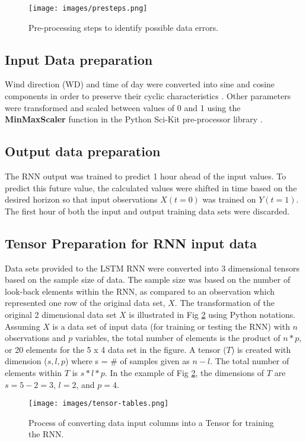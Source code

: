 \documentclass[preprint,12pt,authoryear]{elsarticle}
\begin{document}
\begin{linenumbers}
%
\begin{figure}[H]
\centering
\texttt{[image: images/presteps.png]} 
\caption{Pre-processing steps to identify possible data errors.}
\label{fig:presteps}
\end{figure}
%

\subsection{Input Data preparation}
Wind direction (WD) and time of day were converted into sine and cosine components in order to preserve their cyclic characteristics \citep{Freeman2018a, Arhami2013}. Other parameters were transformed and scaled between values of 0 and 1 \citep{Chatterjee2017} using the \textbf{MinMaxScaler} function in the Python Sci-Kit pre-processor library \citep{scikit2011}. 

\subsection{Output data preparation}
The RNN output was trained to predict 1 hour ahead of the input values. To predict this future value, the calculated values were shifted in time based on the desired horizon so that input observations $X(t=0)$ was trained on $Y(t=1)$.  The first hour of both the input and output training data sets were discarded. 

\subsection{Tensor Preparation for RNN input data}
Data sets provided to the LSTM RNN were converted into 3 dimensional tensors based on the sample size of data. The sample size was based on the number of look-back elements within the RNN, as compared to an observation which represented one row of the original data set, $X$.  The transformation of the original 2 dimensional data set $X$ is illustrated in Fig \ref{fig:tensor-tables} using Python notations. Assuming $X$ is a data set of input data (for training or testing the RNN) with $n$ observations and $p$ variables, the total number of elements is the product of $n * p$, or 20 elements for the 5 x 4 data set in the figure. A tensor ($T$) is created with dimension ($s, l, p$) where s = \# of samples given as $n - l$. The total number of elements within $T$ is $s*l*p$. In the example of Fig \ref{fig:tensor-tables}, the dimensions of $T$ are $s = 5 - 2 = 3$, $l = 2$, and $p = 4$.    
%
\begin{figure}[H]
\centering
\texttt{[image: images/tensor-tables.png]}  %
\caption{Process of converting data input columns into a Tensor for training the RNN.}
\label{fig:tensor-tables}
\end{figure}
%





\end{linenumbers}
\end{document}
